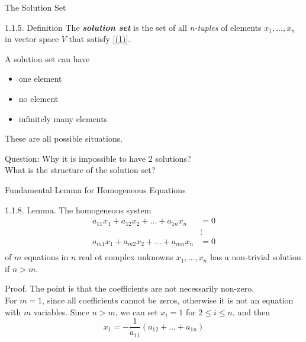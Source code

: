\documentclass[hyperref={pdfpagelabels=true}]{beamer}
\newcommand{\highlightg}[1]{\textcolor[rgb]{0.1,0.5,0.3}{\emph{\textbf{#1}}}}
\newcommand{\<}{\langle}
\renewcommand{\>}{\rangle}
\begin{document}
\begin{frame}{The Solution Set}
    \begin{block}{1.1.5. Definition} The \highlightg{solution set} is the set of all \textit{n-tuples} of elements $x_1,...,x_n$ in vector space $V$ that satisfy \ref{(1)}.
    \end{block}
    \begin{block}{}
        A solution set can have 
        \begin{itemize}
            \item one element
            \item no element
            \item infinitely many elements
        \end{itemize}
        These are all possible situations. 
    \end{block}
    \begin{block}{Question:}
        Why it is impossible to have 2 solutions?\\
        What is the structure of the solution set?
    \end{block}
\end{frame}
\begin{frame}{Fundamental Lemma for Homogeneous Equations}
    \begin{block}{1.1.8. Lemma.}
        The homogeneous system
        \[ 
        \begin{aligned}
            a_{11}x_1+a_{12}x_2+...+a_{1n}x_{n} &= 0 \\
            & \vdots \\
            a_{m1}x_1+a_{m2}x_2+...+a_{mn}x_{n} &= 0 \\ 
        \end{aligned}
        \]
        of $m$ equations in $n$ real ot complex unknowns $x_1,...,x_n$ has a non-trivial solution if $n > m$.
    \end{block}
    \begin{block}{Proof.}
        The point is that the coefficients are not necessarily non-zero.\\
        For $m = 1$, since all coefficients cannot be zeros, otherwise it is not an equation with $m$ variables. Since $n > m$, we can set $x_i = 1$ for $2 \leq i \leq n$, and then 
        \[x_1 = -\frac{1}{a_{11}}(a_{12}+...+a_{1n})\]
    \end{block}
\end{frame}
\end{document}
